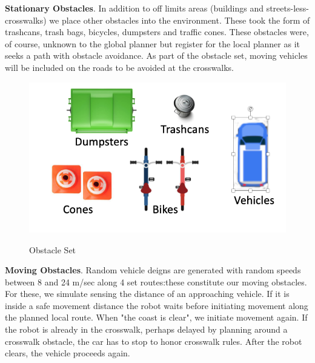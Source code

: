 \documentclass{article}
\begin{document}
\begin{multicols}{2}
\noindent \textbf{Stationary Obstacles}. In addition to off limits areas (buildings and streets-less-crosswalks) we place other obstacles into the environment.  These took the form of trashcans, trash bags, bicycles, dumpsters and traffic cones.  These obstacles were, of course, unknown to the global planner but register for the local planner as it seeks a path with obstacle avoidance.  As part of the obstacle set, moving vehicles will be included on the roads to be avoided at the crosswalks.
\begin{figure}[H]
   \centering
    \includegraphics[width = 1\columnwidth]{figures/obstacles.png}
     \label{fig:obstacles}
     \caption{Obstacle Set}
\end{figure}
\noindent \textbf{Moving Obstacles}. Random vehicle deigns are generated with random speeds between 8 and 24 m/sec along 4 set routes:these constitute our moving obstacles. For these, we simulate sensing the distance of an approaching vehicle.  If it is inside a safe movement distance the robot waits before initiating movement along the planned local route. When "the coast is clear", we initiate movement again.  If the robot is already in the crosswalk, perhaps delayed by planning around a crosswalk obstacle, the car has to stop to honor crosswalk rules.  After the robot clears, the vehicle proceeds again.


\end{multicols}
\end{document}
